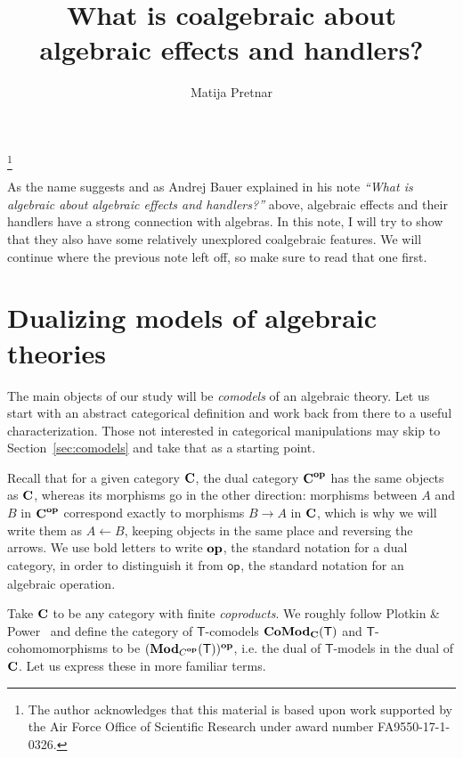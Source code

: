 \documentclass{amsart}
\newcommand{\theory}[1]{\mathsf{#1}} %
\newcommand{\ModC}[2]{\text{\textbf{Mod}}_{\category{#1}}(\theory{#2})} %
\newcommand{\ComodC}[2]{\text{\textbf{CoMod}}_{\category{#1}}(\theory{#2})} %
\newcommand{\opcat}[1]{\ensuremath{#1^{\text{\textbf{op}}}}}
\newcommand{\from}{\leftarrow}
\newcommand{\category}[1]{\text{\textbf{#1}}} %
\newcommand{\op}[1]{\mathsf{op}_{#1}} %
\begin{document}
\title{What is coalgebraic about algebraic effects and handlers?}
\thanks{The author acknowledges that this material is based upon work
 supported by the Air Force Office of Scientific Research under award number
 FA9550-17-1-0326.}
\author{Matija Pretnar}

\maketitle

As the name suggests and as Andrej Bauer explained in his note \emph{``What is algebraic about algebraic effects and handlers?''} above, algebraic effects and their handlers have a strong connection with algebras. In this note, I will try to show that they also have some relatively unexplored coalgebraic features. We will continue where the previous note left off, so make sure to read that one first.


\section{Dualizing models of algebraic theories}
\label{sec:dualizing-models}

The main objects of our study will be \emph{comodels} of an algebraic theory. Let us start with an abstract categorical definition and work back from there to a useful characterization. Those not interested in categorical manipulations may skip to Section~\ref{sec:comodels} and take that as a starting point.

Recall that for a given category $\category{C}$, the dual category $\opcat{\category{C}}$ has the same objects as $\category{C}$, whereas its morphisms go in the other direction: morphisms between $A$ and $B$ in $\opcat{\category{C}}$ correspond exactly to morphisms $B \to A$ in $\category{C}$, which is why we will write them as $A \from B$, keeping objects in the same place and reversing the arrows. We use bold letters to write $\text{\textbf{op}}$, the standard notation for a dual category, in order to distinguish it from $\op{}$, the standard notation for an algebraic operation.

Take $\category{C}$ to be any category with finite \emph{coproducts}. We roughly follow Plotkin \& Power~\cite{power} and define the category of $\theory{T}$-comodels $\ComodC{C}{T}$ and $\theory{T}$-cohomomorphisms to be $\opcat{(\ModC{\opcat{C}}{T})}$, i.e. the dual of $\theory{T}$-models in the dual of $\category{C}$. Let us express these in more familiar terms.
\end{document}
